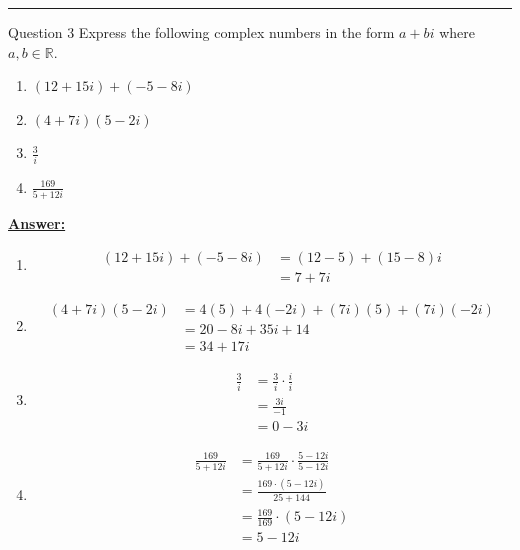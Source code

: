 \documentclass{article}
\newcommand{\R}{\mathbb{R}}
\begin{document}
\vskip 0.5cm
\hrule 
\vskip 0.5cm


\begin{mathdefinitionbox}{Question 3}
  \vskip 0.5cm
  Express the following complex numbers in the form $a + bi$ where $a, b \in \R$.
    \begin{enumerate}[label=(\alph*)]
      \item $(12 + 15i) + (-5 - 8i)$ 
      \item $(4 + 7i) (5 - 2i)$ 
      \item $\frac{3}{i}$ 
      \item $\frac{169}{5 + 12i}$ 
    \end{enumerate}
  \end{mathdefinitionbox}
  
  \vskip 0.5cm
  \underline{\textbf{Answer:}} 
  
  \begin{enumerate}[label=(\alph*)]
    \item \begin{align*}
      (12 + 15i) + (-5 - 8i) &= (12 - 5) + (15 - 8)i \\
      &= 7 + 7i
    \end{align*}

    
    \item \begin{align*}
      (4 + 7i) (5 - 2i) &= 4(5) + 4(-2i) + (7i)(5) +(7i)(-2i) \\
      &= 20 - 8i + 35i + 14 \\
      &= 34 + 17i
    \end{align*} 

  
    \item \begin{align*}
      \frac{3}{i} &= \frac{3}{i} \cdot \frac{i}{i} \\
      &= \frac{3i}{-1} \\
      &= 0 - 3i
    \end{align*} 


    \item \begin{align*}
      \frac{169}{5 + 12i} &= \frac{169}{5 + 12i} \cdot \frac{5 - 12i}{5 - 12i}\\
      &= \frac{169 \cdot (5 - 12i)}{25 + 144} \\
      &= \frac{169}{169} \cdot (5 - 12i) \\
      &= 5 - 12i
    \end{align*} 
  \end{enumerate}
  
\end{document}
